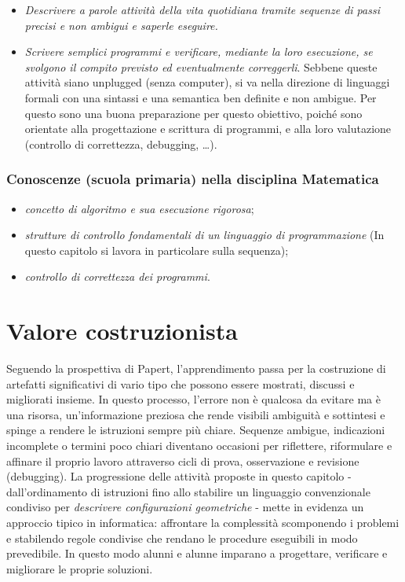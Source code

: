 \begin{itemize}
\item
  \emph{Descrivere a parole attività della vita quotidiana tramite sequenze di passi precisi e non ambigui e saperle eseguire.}
\item
  \emph{Scrivere semplici programmi e verificare, mediante la loro esecuzione, se svolgono il compito previsto ed eventualmente correggerli}. Sebbene queste attività siano unplugged (senza computer), si va nella direzione di linguaggi formali con una sintassi e una semantica ben definite e non ambigue. Per questo sono una buona preparazione per questo obiettivo, poiché sono orientate alla progettazione e scrittura di programmi, e alla loro valutazione (controllo di correttezza, debugging, \ldots).

\end{itemize}


\subsubsection{Conoscenze (scuola primaria) nella disciplina Matematica}



\begin{itemize}
\item
  \emph{concetto di algoritmo e sua esecuzione rigorosa};
\item
  \emph{strutture di controllo fondamentali di un linguaggio di programmazione} (In questo capitolo si lavora in particolare sulla sequenza);
\item
  \emph{controllo di correttezza dei programmi}.
\end{itemize}

\section{Valore costruzionista }\label{valore-costruzionista}

Seguendo la prospettiva di Papert, l'apprendimento passa per la costruzione di artefatti significativi di vario tipo che possono essere mostrati, discussi e migliorati insieme. In questo processo, l'errore non è qualcosa da evitare ma è una risorsa, un'informazione preziosa che rende visibili ambiguità e sottintesi e spinge a rendere le istruzioni sempre più chiare. Sequenze ambigue, indicazioni incomplete o termini poco chiari diventano occasioni per riflettere, riformulare e affinare il proprio lavoro attraverso cicli di prova, osservazione e revisione (debugging). La progressione delle attività proposte in questo capitolo - dall'ordinamento di istruzioni fino allo stabilire un linguaggio convenzionale condiviso per \emph{descrivere configurazioni geometriche} - mette in evidenza un approccio tipico in informatica: affrontare la complessità scomponendo i problemi e stabilendo regole condivise che rendano le procedure eseguibili in modo prevedibile. In questo modo alunni e alunne imparano a progettare, verificare e migliorare le proprie soluzioni.

